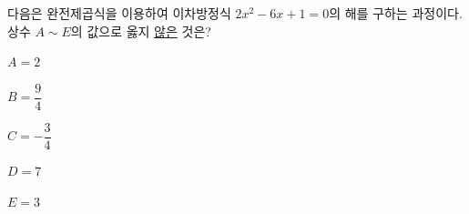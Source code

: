 다음은 완전제곱식을 이용하여 이차방정식 $2x^2-6x+1=0$의 해를 구하는 과정이다. 상수 $A\sim E$의 값으로 옳지 \underline{않은} 것은?
\begin{choices32}{\rule[-3ex]{0pt}{8ex}$A=2$}{\rule[-3ex]{0pt}{8ex}$B=\dfrac{9}{4}$}{\rule[-3ex]{0pt}{8ex}$C=-\dfrac{3}{4}$}{\rule[-3ex]{0pt}{8ex}$D=7$}{\rule[-3ex]{0pt}{8ex}$E=3$}\end{choices32}
